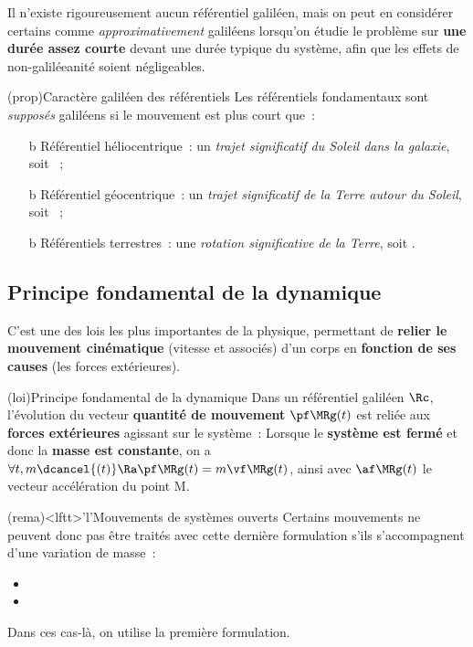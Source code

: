 \documentclass[../../main/main.tex]{subfiles}
\begin{document}
Il n'existe rigoureusement aucun référentiel galiléen, mais on peut en
considérer certains comme \textit{approximativement} galiléens lorsqu'on étudie
le problème sur \textbf{une durée assez courte} devant une durée typique du
système, afin que les effets de non-galiléeanité soient négligeables.

\begin{tcb*}[breakable](prop){Caractère galiléen des référentiels}
	Les référentiels fondamentaux sont \textit{supposés} galiléens si le mouvement
	est plus court que~:
	\begin{itemize}
		\item[b]{Référentiel héliocentrique}~:
		      un \textit{trajet significatif du Soleil dans la galaxie}, soit
		      ~;
		\item[b]{Référentiel géocentrique}~:
		      un \textit{trajet significatif de la Terre autour du Soleil}, soit
		      ~;
		\item[b]{Référentiels terrestres}~:
		      une \textit{rotation significative de la Terre}, soit
		      .
	\end{itemize}
\end{tcb*}

\subsection{Principe fondamental de la dynamique}

C'est une des lois les plus importantes de la physique, permettant de
\textbf{relier le mouvement cinématique} (vitesse et associés) d'un corps en
\textbf{fonction de ses causes} (les forces extérieures).

\begin{tcb*}(loi){Principe fondamental de la dynamique}
	Dans un référentiel galiléen $\Rc$, l'évolution du vecteur
	\textbf{quantité de mouvement} $\pf\MRg(t)$ est reliée aux \textbf{forces
		extérieures} agissant sur le système~:
	\psw{%
		\[
			\boxed{\dv{\pf\MRg}{t} = \sum \Ff_{\ext\ra\Mr}}
		\]
	}
	Lorsque le \textbf{système est fermé} et donc la \textbf{masse est constante},
	on a $\forall t, m \dcancel{(t)} \Ra \pf\MRg(t) = m\vf\MRg(t)$, ainsi
	\psw{%
		\[
			\boxed{m\af\MRg(t) = \sum \Ff_{\ext\ra\Mr}}
		\]
	}
	avec $\af\MRg(t)$ le vecteur accélération du point M.
\end{tcb*}

\begin{tcb*}(rema)<lftt>'l'{Mouvements de systèmes ouverts}
	Certains mouvements ne peuvent donc pas être traités avec cette dernière
	formulation s'ils s'accompagnent d'une variation de masse~:
	\begin{itemize}
		\item {}
		\item {}
	\end{itemize}
	Dans ces cas-là, on utilise la première formulation.
\end{tcb*}
\end{document}
